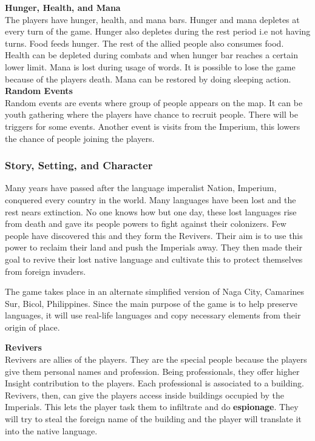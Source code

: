 \documentclass[11pt]{article}
\begin{document}
\textbf{Hunger, Health, and Mana}\\
The players have hunger, health, and mana bars. Hunger and mana depletes at every turn of the game. Hunger also depletes during the rest period i.e not having turns. Food feeds hunger. The rest of the allied people also consumes food. Health can be depleted during combats and when hunger bar reaches a certain lower limit. Mana is lost  during usage of words. It is possible to lose the game because of the players death. Mana can be restored by doing sleeping action.\\

\textbf{Random Events}\\
Random events are events where group of people appears on the map. It can be youth gathering where the players have chance to recruit people. There will be triggers for some events. Another event is visits from the Imperium, this lowers the chance of people joining the players.\\


\subsubsection{Story, Setting, and Character}
Many years have passed after the language imperalist Nation, Imperium, conquered every country in the world. Many languages have been lost and the rest nears extinction. No one knows how but one day, these lost languages rise from death and gave its people powers to fight against their colonizers. Few people have discovered this and they form the Revivers. Their aim is to use this power to reclaim their land and push the Imperials away. They then made their goal to revive their lost native language and cultivate this to protect themselves from foreign invaders. 

The game takes place in an alternate simplified version of Naga City, Camarines Sur, Bicol, Philippines. Since the main purpose of the game is to help preserve languages, it will use real-life languages and copy necessary elements from their origin of place.

\textbf{Revivers}\\
Revivers are allies of the players. They are the special people because the players give them personal names and profession. Being professionals, they offer higher Insight contribution to the players. Each professional is associated to a building. Revivers, then, can give the players access inside buildings occupied by the Imperials. This lets the player task them to infiltrate and do \textbf{espionage}. They will try to steal the foreign name of the building and the player will translate it into the native language.
\end{document}
